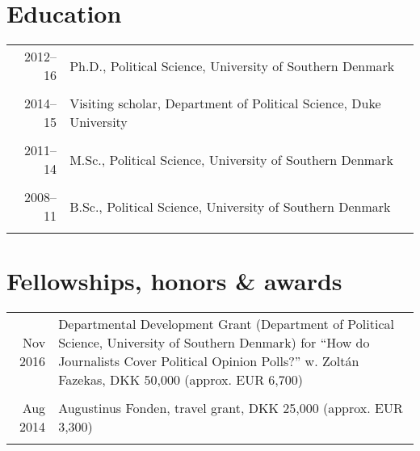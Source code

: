 \documentclass[a4paper,10pt]{article}
\begin{document}
\vspace{.7em}
\section{Education}

\begin{tabular}{r|p{11cm}}
2012--16 & Ph.D., Political Science, University of Southern Denmark \\
\multicolumn{2}{c}{} \\

\textsc{2014--15} & Visiting scholar, Department of Political Science, Duke University\\
\multicolumn{2}{c}{} \\

\textsc{2011--14} & M.Sc., Political Science, University of Southern Denmark\\
\multicolumn{2}{c}{} \\

\textsc{2008--11} & B.Sc., Political Science, University of Southern Denmark\\
\multicolumn{2}{c}{} \\

\end{tabular}

%

\vspace{.7em}
\section{Fellowships, honors \& awards}
\begin{tabular}{r|p{11cm}}
Nov 2016 & Departmental Development Grant (Department of Political Science, University of Southern Denmark) for ``How do Journalists Cover Political Opinion Polls?'' w. Zolt\'{a}n Fazekas, DKK 50,000 (approx. EUR 6,700)\\
\multicolumn{2}{c}{} \\

Aug 2014 & Augustinus Fonden, travel grant, DKK 25,000 (approx. EUR 3,300) \\
\multicolumn{2}{c}{} \\
\end{tabular}

\vspace{.7em}
\end{document}
